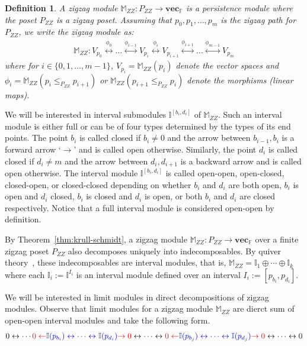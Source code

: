 \documentclass[11pt]{article}
\theoremstyle{plain}%
\newtheorem{definition}{Definition}[section]
\newcommand{\Int}{\mathbb{I}}
\newcommand{\vecsp}{\mathbf{vec}_{\mathbb{F}}}
\newcommand{\M}{\mathbb{M}}
\begin{document}
\begin{definition}
A zigzag module $\M_{ZZ}: P_{ZZ}\rightarrow \vecsp$ is a persistence module where
the poset $P_{ZZ}$ is a zigzag poset. Assuming that 
$p_0,p_1,\ldots, p_m$ is the zigzag path for $P_{ZZ}$, we write the zigzag module as:
\begin{eqnarray}
\M_{ZZ}: V_{p_0}\stackrel{\phi_0}{\longleftrightarrow}\ldots \stackrel{\phi_{i-1}}{\longleftrightarrow}V_{p_i}\stackrel{\phi_i}{\longleftrightarrow} V_{p_{i+1}}\stackrel{\phi_{i+1}}{\longleftrightarrow}\ldots\stackrel{\phi_{m-1}}{\longleftrightarrow} V_{p_m}
\label{zigzag-module}
\end{eqnarray}
where for $i\in \{0,1,\ldots,m-1\}$, $V_{p_i}=\M_{ZZ}(p_i)$ denote the vector spaces and $\phi_i=\M_{ZZ}(p_i\leq_{P_{ZZ}} p_{i+1})$ or
$\M_{ZZ}(p_{i+1}\leq_{P_{ZZ}}p_i)$ denote
the morphisms (linear maps).
\end{definition}
We will be interested in interval submodules $\Int^{[b_i,d_i]}$ of $\M_{ZZ}$. Such an interval module is either full or can be of four types
determined by the types of its end points. The point $b_i$ is called
closed if $b_i\not=0$ and the arrow between $b_{i-1},b_i$ is a forward arrow `$\rightarrow$' and is called open otherwise. Similarly, the point $d_i$ is called closed if
$d_i\not=m$ and the arrow between $d_{i}, d_{i+1}$ is a backward arrow and is called open otherwise. The interval module $\Int^{[b_i,d_i]}$ is called open-open, open-closed, closed-open, or closed-closed depending on whether $b_i$ and $d_i$ are both open,
$b_i$ is open and $d_i$ closed, $b_i$ is closed and $d_i$ is open, or
both $b_i$ and $d_i$ are closed respectively. Notice that a full interval module
is considered open-open by definition.

By Theorem~\ref{thm:krull-schmidt}, a zigzag module $\M_{ZZ}:P_{ZZ}\rightarrow \vecsp$ over a  finite zigzag poset $P_{ZZ}$ also decomposes uniquely into indecomposables. By quiver theory~\cite{Gabriel72,Oudot15}, these indecomposables are interval modules, that is,
$\M_{ZZ}= \Int_1\oplus\cdots \oplus \Int_k$ where each $\Int_i:=\Int^{I_i}$ is an interval module
defined over an interval $I_i:=[p_{b_i},p_{d_i}]$. 

We will be interested in limit modules in direct decompositions of zigzag modules.
Observe that limit modules for a zigzag module $\M_{ZZ}$ are dierct
sum of open-open interval modules and take the following form.
\begin{eqnarray}
 0\leftrightarrow\cdots {\color{red}{0\leftarrow}} {\color{blue} \Int({p_{b_i}}) \leftrightarrow\cdots\leftrightarrow \Int({p_{d_i}})}{\color{red}\rightarrow 0} \leftrightarrow  \cdots \leftrightarrow {\color{red} 0 \leftarrow}{\color{blue} \Int({p_{b_j}}) \leftrightarrow\cdots\leftrightarrow \Int({p_{d_j}})}{\color{red}\rightarrow 0}\leftrightarrow \cdots \leftrightarrow 0
\label{eq:representative}
\end{eqnarray}
\end{document}
